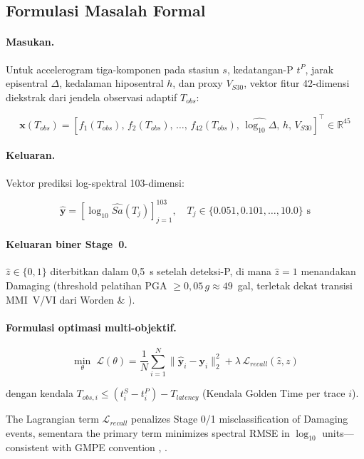 \documentclass[10pt]{article}
\renewcommand{\cite}[1]{\citep{#1}}
\begin{document}
\subsection{Formulasi Masalah Formal}

\paragraph{Masukan.} Untuk accelerogram tiga-komponen pada stasiun \(s\), kedatangan-P \(t^P\), jarak episentral \(\Delta\), kedalaman hiposentral \(h\), dan proxy \(V_{S30}\), vektor fitur 42-dimensi diekstrak dari jendela observasi adaptif \(T_{obs}\):

\[\mathbf{x}(T_{obs}) = \left[f_1(T_{obs}),\, f_2(T_{obs}),\, \ldots,\, f_{42}(T_{obs}),\, \widehat{\log_{10}\Delta},\, h,\, V_{S30}\right]^\top \in \mathbb{R}^{45}\]

\paragraph{Keluaran.} Vektor prediksi log-spektral 103-dimensi:

\[\hat{\mathbf{y}} = \left[\log_{10}\widehat{Sa}(T_j)\right]_{j=1}^{103}, \quad T_j \in \{0.051, 0.101, \ldots, 10.0\}\text{ s}\]

\paragraph{Keluaran biner Stage~0.} \(\hat{z} \in \{0, 1\}\) diterbitkan dalam 0,5~s setelah deteksi-P, di mana \(\hat{z} = 1\) menandakan Damaging (threshold pelatihan PGA \(\geq 0,05\,g \approx 49\)~gal, terletak dekat transisi MMI~V/VI dari Worden \& \citet{ref45}).

\paragraph{Formulasi optimasi multi-objektif.}

\[\underset{\theta}{\min}\; \mathcal{L}(\theta) = \frac{1}{N} \sum_{i=1}^{N} \|\hat{\mathbf{y}}_i - \mathbf{y}_i\|^2_2 + \lambda\, \mathcal{L}_{recall}(\hat{z}, z)\]

dengan kendala \(T_{obs,i} \leq (t^S_i - t^P_i) - T_{latency}\) (Kendala Golden Time per trace \(i\)).

The Lagrangian term \(\mathcal{L}_{recall}\) penalizes Stage 0/1 misclassification of Damaging events, sementara the primary term minimizes spectral RMSE in \(\log_{10}\) units---consistent with GMPE convention \cite{ref48}, \cite{ref49}.
\end{document}
